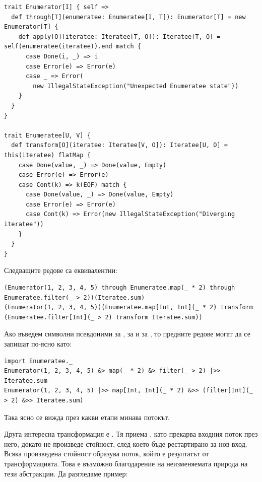 \begin{lstlisting}
trait Enumerator[I] { self =>
  def through[T](enumeratee: Enumeratee[I, T]): Enumerator[T] = new Enumerator[T] {
    def apply[O](iteratee: Iteratee[T, O]): Iteratee[T, O] = self(enumeratee(iteratee)).end match {
      case Done(i, _) => i
      case Error(e) => Error(e)
      case _ => Error(
        new IllegalStateException("Unexpected Enumeratee state"))
    }
  }
}

trait Enumeratee[U, V] {
  def transform[O](iteratee: Iteratee[V, O]): Iteratee[U, O] = this(iteratee) flatMap {
    case Done(value, _) => Done(value, Empty)
    case Error(e) => Error(e)
    case Cont(k) => k(EOF) match {
      case Done(value, _) => Done(value, Empty)
      case Error(e) => Error(e)
      case Cont(k) => Error(new IllegalStateException("Diverging iteratee"))
    }
  }
}
\end{lstlisting}

Следващите редове са еквивалентни:

\begin{lstlisting}
(Enumerator(1, 2, 3, 4, 5) through Enumeratee.map(_ * 2) through Enumeratee.filter(_ > 2))(Iteratee.sum)
(Enumerator(1, 2, 3, 4, 5))(Enumeratee.map[Int, Int](_ * 2) transform (Enumeratee.filter[Int](_ > 2) transform Iteratee.sum))
\end{lstlisting}

Ако въведем символни псевдоними \code{|>>} за , \code{&>} за  и \code{&>>} за , то предните редове могат да се запишат по-ясно като:

\begin{lstlisting}
import Enumeratee._
Enumerator(1, 2, 3, 4, 5) &> map(_ * 2) &> filter(_ > 2) |>> Iteratee.sum
Enumerator(1, 2, 3, 4, 5) |>> map[Int, Int](_ * 2) &>> (filter[Int](_ > 2) &>> Iteratee.sum)
\end{lstlisting}

Така ясно се вижда през какви етапи минава потокът.

Друга интересна трансформация е . Тя приема , като прекарва входния поток през него, докато не произведе стойност, след което бъде рестартирано за нов вход. Всяка произведена стойност образува поток, който е резултатът от трансформацията. Това е възможно благодарение на неизменяемата природа на тези абстракции. Да разгледаме пример:

